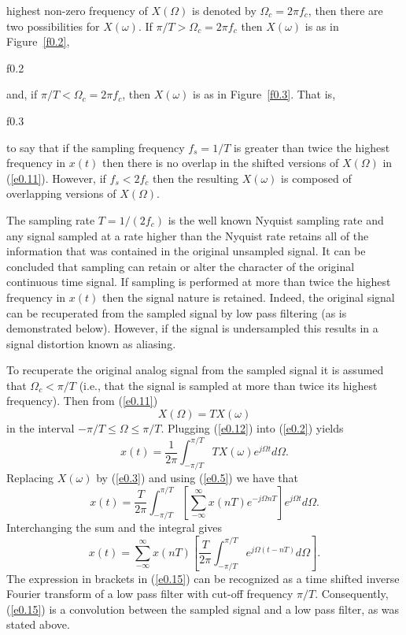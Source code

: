%
highest non-zero frequency of $X(\Omega)$ is denoted by $\Omega_c=2\pi f_c$,
then there are two possibilities for $X(\omega)$.  If
$\pi/T>\Omega_c=2\pi f_c$ then $X(\omega)$ is as in Figure~\ref{f0.2},
%

{f0.2}

%
and, if $\pi/T<\Omega_c=2\pi f_c$, then $X(\omega)$ is as in
Figure~\ref{f0.3}.  That is,
%

{f0.3}

%
to say that if the sampling frequency $f_s=1/T$ is greater
than twice the highest frequency in $x(t)$ then there is
no overlap in the shifted versions of $X(\Omega)$
in (\ref{e0.11}).  However, if $f_s<2f_c$ then the resulting 
$X(\omega)$ is composed of overlapping versions of $X(\Omega)$.

	The sampling rate $T=1/(2f_c)$ is the well known
Nyquist sampling rate and any signal sampled at a rate higher 
than the Nyquist rate retains all of the information
that was contained in the original unsampled signal.
It can be concluded that sampling can retain
or alter the character of the original continuous time signal.
If sampling is performed at more than twice the highest frequency
in $x(t)$ then the signal nature is retained.  Indeed, the
original signal can be recuperated from the sampled signal
by low pass filtering (as is demonstrated below).  However,
if  the signal is undersampled this results in a signal
distortion known as aliasing.

	To recuperate the original analog signal from
the sampled signal it is assumed that $\Omega_c<\pi/T$ (i.e., that
the signal is sampled at more than twice its highest 
frequency).  Then from (\ref{e0.11})
%
\begin{equation}
X(\Omega)=TX(\omega)
\label{e0.12}
\end{equation}
%
in the interval $-\pi/T\le\Omega\le\pi/T$.  Plugging (\ref{e0.12})
into (\ref{e0.2}) yields
%
\begin{equation}
x(t)=\frac{1}{2\pi}\int_{-\pi/T}^{\pi/T}TX(\omega)e^{j\Omega t}d\Omega.
\label{e0.13}
\end{equation}
%
Replacing $X(\omega)$ by (\ref{e0.3}) and using (\ref{e0.5}) we have that
%
\begin{equation}
x(t)=\frac{T}{2\pi}\int_{-\pi/T}^{\pi/T}[
      \sum_{-\infty}^{\infty}x(nT)e^{-j\Omega nT}]e^{j\Omega t}d\Omega.
\label{e0.14}
\end{equation}
%
Interchanging the sum and the integral gives
%
\begin{equation}
x(t)=\sum_{-\infty}^{\infty}x(nT)
     [\frac{T}{2\pi}\int_{-\pi/T}^{\pi/T}
    e^{j\Omega(t- nT)}d\Omega].
\label{e0.15}
\end{equation}
%
The expression in brackets in (\ref{e0.15}) can be recognized as
a time shifted inverse Fourier transform of a low pass filter with
cut-off frequency $\pi/T$.  Consequently, (\ref{e0.15}) is a
convolution between the sampled signal and a low pass filter,
as was stated above.

